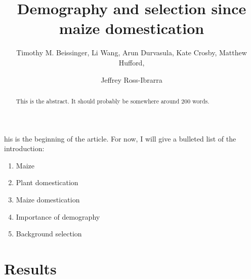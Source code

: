 \documentclass{pnastwo}
\begin{document}
\title{Demography and selection since maize domestication}
\author{Timothy M. Beissinger, Li Wang, Arun
  Durvasula, Kate Crosby, Matthew Hufford, \and Jeffrey
  Ross-Ibrarra }


\maketitle

\begin{article}

\begin{abstract}
This is the abstract. It should probably be somewhere around 200 words.
\end{abstract}

his is the beginning of the article. For now, I will give a
bulleted list of the introduction:
\begin{enumerate}
\item Maize
\item Plant domestication
\item Maize domestication
\item Importance of demography
\item Background selection
\end{enumerate}



\section{Results}

\end{article}
\end{document}
